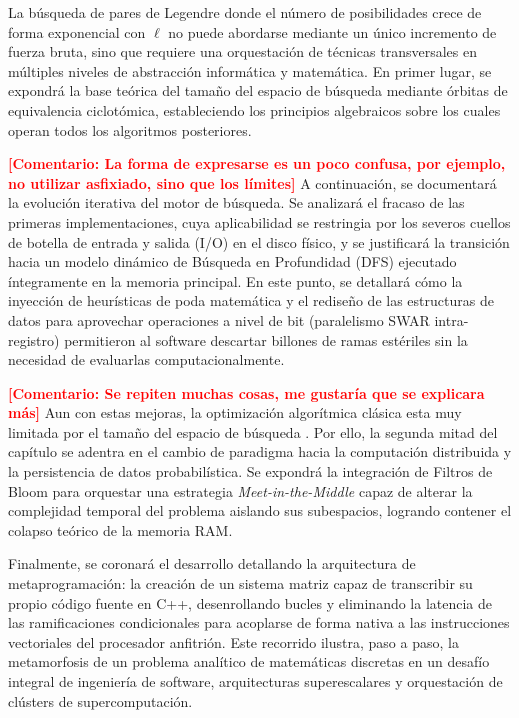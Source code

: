 \documentclass[12pt,a4paper]{tfg_domingo}
\newcommand{\Comentario}[1]{\textcolor{red}{\textbf{[Comentario:
      #1]}}}
\begin{document}
La búsqueda de pares de Legendre donde el número de posibilidades
crece de forma exponencial con $\ell$ no puede abordarse mediante un
único incremento de fuerza bruta, sino que requiere una orquestación
de técnicas transversales en múltiples niveles de abstracción
informática y matemática. En primer lugar, se expondrá la base teórica
del tamaño del espacio de búsqueda mediante órbitas de equivalencia
ciclotómica, estableciendo los principios algebraicos  sobre los
cuales operan todos los algoritmos posteriores.  

\Comentario{La forma de expresarse es un poco confusa, por ejemplo, no
utilizar asfixiado, sino que los límites}
A continuación, se documentará la evolución iterativa del motor de
búsqueda. Se analizará el fracaso de las primeras implementaciones,
cuya aplicabilidad se restringia  por los severos cuellos de botella
de entrada y salida (I/O) en el disco físico, y se justificará la
transición hacia un modelo dinámico de Búsqueda en Profundidad (DFS)
ejecutado íntegramente en la memoria principal. En este punto, se
detallará cómo la inyección de heurísticas de poda matemática y el
rediseño de las estructuras de datos para aprovechar operaciones a
nivel de bit (paralelismo SWAR intra-registro) permitieron al software
descartar billones de ramas estériles sin la necesidad de evaluarlas
computacionalmente. 

\Comentario{Se repiten muchas cosas, me gustaría que se explicara más}
Aun con estas mejoras, la optimización algorítmica clásica esta muy
limitada por el tamaño del espacio de búsqueda . Por ello, la segunda
mitad del capítulo se adentra en el cambio de paradigma hacia la
computación distribuida y la persistencia de datos probabilística. Se
expondrá la integración de Filtros de Bloom para orquestar una
estrategia \emph{Meet-in-the-Middle} capaz de alterar la complejidad
temporal del problema aislando sus subespacios, logrando contener el
colapso teórico de la memoria RAM.  

Finalmente, se coronará el desarrollo detallando la arquitectura de
metaprogramación: la creación de un sistema matriz capaz de
transcribir su propio código fuente en C++, desenrollando bucles y
eliminando la latencia de las ramificaciones condicionales para
acoplarse de forma nativa a las instrucciones vectoriales del
procesador anfitrión. Este recorrido ilustra, paso a paso, la
metamorfosis de un problema analítico de matemáticas discretas en un
desafío integral de ingeniería de software, arquitecturas
superescalares y orquestación de clústers de supercomputación. 
\end{document}
